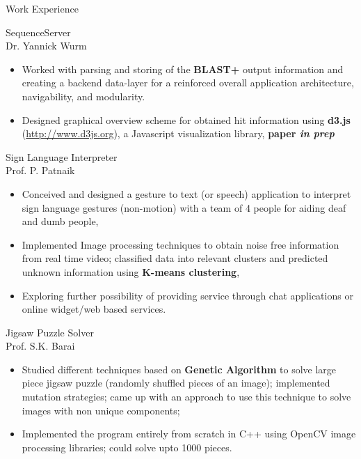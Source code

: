 \documentclass{article}
\newlength{\tabin}
\newlength{\secsep}
\newcommand{\lineunder}{\vspace*{-8pt} \\ \hspace*{-6pt} \hrulefill \\ \vspace*{-15pt}}
\newenvironment{tabbedsection}[1]{
  \begin{list}{}{
      \setlength{\itemsep}{0pt}
      \setlength{\labelsep}{0pt}
      \setlength{\labelwidth}{0pt}
      \setlength{\leftmargin}{\tabin}
      \setlength{\rightmargin}{\tabin}
      \setlength{\listparindent}{0pt}
      \setlength{\parsep}{0pt}
      \setlength{\parskip}{0pt}
      \setlength{\partopsep}{0pt}
      \setlength{\topsep}{#1}
    }
  \item[]
}{\end{list}}
\newenvironment{resume_section}[1]{
  \filbreak
  \vspace{2\secsep}
  \textsc{\large#1}
  \lineunder
  \begin{tabbedsection}{\secsep}
}{\end{tabbedsection}}
\newenvironment{resume_subsection}[2][]{
  \textbf{#2} \hfill {\footnotesize #1} \hspace{1.0em}
  \begin{tabbedsection}{0.5\secsep}
}{\end{tabbedsection}}
\newenvironment{subitems}{
  \renewcommand{\labelitemi}{$\cdot$}
  \begin{itemize}
      \setlength{\labelsep}{1em}
}{\end{itemize}}
\begin{document}
\begin{resume_section}  {Work Experience}
  \begin{resume_subsection}{SequenceServer \\ \footnotesize {Dr. Yannick Wurm}}
    \begin{subitems}
      \item Worked with parsing and storing of the \textbf{BLAST+} output information and creating a backend data-layer for a reinforced overall application architecture, navigability, and modularity.
      \item Designed graphical overview scheme for obtained hit information using \textbf{d3.js} ({\footnotesize \url{http://www.d3js.org}}), a Javascript visualization library, \textbf{paper \emph{in prep}} \\
    \end{subitems}
    \end{resume_subsection}

  \begin{resume_subsection}[Apr, 2014]{Sign Language Interpreter \\ \footnotesize {Prof. P. Patnaik}}
  \begin{subitems}
    \item Conceived and designed a gesture to text (or speech) application to interpret sign language gestures (non-motion) with a team of 4 people for aiding deaf and dumb people,
    \item Implemented Image processing techniques to obtain noise free information from real time video; classified data into relevant clusters and predicted unknown information using \textbf{K-means clustering},
    \item Exploring further possibility of providing service through chat applications or online widget/web based services.\\
    \end{subitems}
  \end{resume_subsection}

  \begin{resume_subsection}[Mar, 2014]{Jigsaw Puzzle Solver \\ \footnotesize {Prof. S.K. Barai}}
    \begin{subitems}
    \item Studied different techniques based on \textbf{Genetic Algorithm} to solve large piece jigsaw puzzle (randomly shuffled pieces of an image); implemented mutation strategies; came up with an approach to use this technique to solve images with non unique components;
    \item Implemented the program entirely from scratch in C++ using OpenCV image processing libraries; could solve upto 1000 pieces.\\
    \end{subitems}
  \end{resume_subsection}


\end{resume_section}
\end{document}
